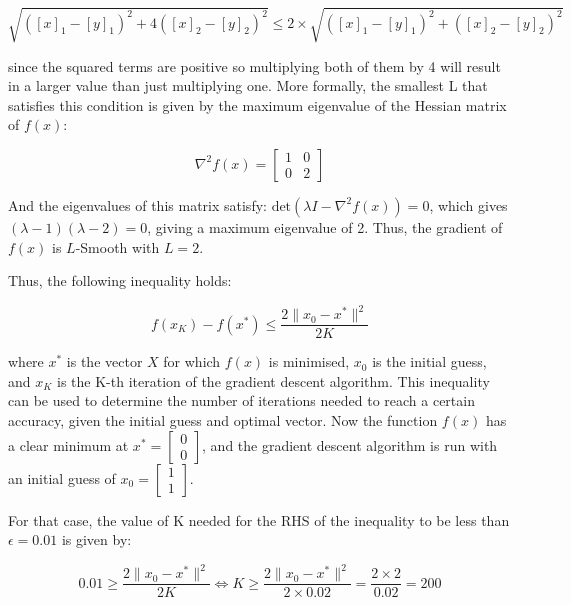 \documentclass[12pt]{report} %
\begin{document}
\begin{equation}
    \sqrt{([x]_1 - [y]_1)^2 + 4([x]_2 - [y]_2)^2} \leq 2 \times \sqrt{([x]_1 - [y]_1)^2 + ([x]_2 - [y]_2)^2}
\end{equation}

since the squared terms are positive so multiplying both of them by 4 will result in a larger value than just multiplying one. More formally, the smallest L that satisfies this condition is given by the maximum eigenvalue of the Hessian matrix of $f(x)$\cite[claim 5]{lecture12}:

\begin{equation}
    \nabla^2 f(x) = \begin{bmatrix} 1 & 0 \\ 0 & 2 \end{bmatrix}
\end{equation}

And the eigenvalues of this matrix satisfy: $\text{det}(\lambda I - \nabla^2 f(x)) = 0$, which gives $(\lambda - 1)(\lambda - 2) = 0$, giving a maximum eigenvalue of 2. Thus, the gradient of $f(x)$ is $L$-Smooth with $L = 2$.

Thus, the following inequality holds:

\begin{equation}
    f(x_K) - f(x^*) \leq \frac{2 \|x_0 - x^*\|^2}{2K}
\end{equation}

where $x^*$ is the vector $X$ for which $f(x)$ is minimised, $x_0$ is the initial guess, and $x_K$ is the K-th iteration of the gradient descent algorithm. This inequality can be used to determine the number of iterations needed to reach a certain accuracy, given the initial guess and optimal vector. Now the function $f(x)$ has a clear minimum at $x^* = \begin{bmatrix} 0 \\ 0 \end{bmatrix}$, and the gradient descent algorithm is run with an initial guess of $x_0 = \begin{bmatrix} 1 \\ 1 \end{bmatrix}$.

For that case, the value of K needed for the RHS of the inequality to be less than $\epsilon = 0.01$ is given by:

\begin{equation}
    0.01 \geq \frac{2 \|x_0 - x^*\|^2}{2K} \iff K \geq \frac{2 \|x_0 - x^*\|^2}{2\times 0.02} = \frac{2 \times 2}{0.02} = 200
\end{equation}
\end{document}
